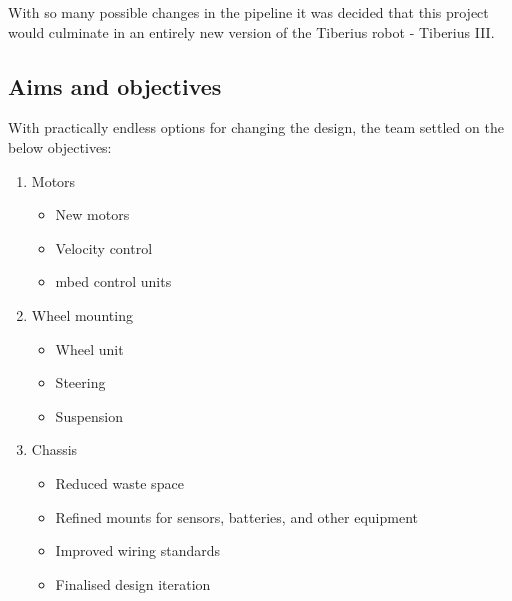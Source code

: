 With so many possible changes in the pipeline it was decided that this project would culminate in an entirely new version of the Tiberius robot - Tiberius III.
\subsection{Aims and objectives}

With practically endless options for changing the design, the team settled on the below objectives:

\begin{enumerate}
	\item Motors
	\begin{itemize}
     	\item New motors
    	\item Velocity control
       	\item mbed control units
   	\end{itemize}
    
   	\item Wheel mounting
   	\begin{itemize}
     	\item Wheel unit
        \item Steering
        \item Suspension
   	\end{itemize}
    
	\item Chassis
   	\begin{itemize}
     	\item Reduced waste space
     	\item Refined mounts for sensors, batteries, and other equipment
     	\item Improved wiring standards
     	\item Finalised design iteration
   \end{itemize}
\end{enumerate}